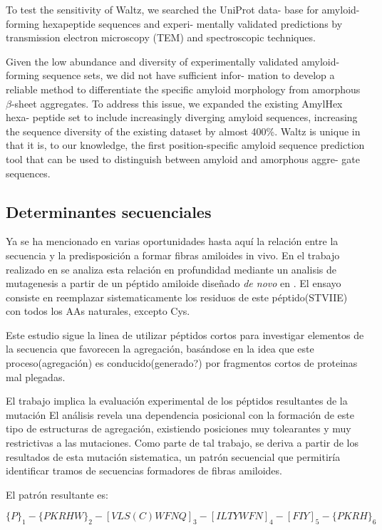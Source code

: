 To test the sensitivity of Waltz, we searched the UniProt data-
base for amyloid-forming hexapeptide sequences and experi-
mentally validated predictions by transmission electron
microscopy (TEM) and spectroscopic techniques.




Given
the low abundance and diversity of experimentally validated
amyloid-forming sequence sets, we did not have sufficient infor-
mation to develop a reliable method to differentiate the specific
amyloid morphology from amorphous $\beta$-sheet aggregates.
To address this issue, we expanded the existing AmylHex hexa-
peptide set to include increasingly diverging amyloid sequences,
increasing the sequence diversity of the existing dataset by almost
400\%. Waltz is unique in that it is, to our knowledge, the first
position-specific amyloid sequence prediction tool that can be
used to distinguish between amyloid and amorphous aggre-
gate sequences.

\subsection{Determinantes secuenciales}
Ya se ha mencionado en varias oportunidades hasta aquí la relación entre la secuencia y la predisposición a formar fibras amiloides in vivo. En el trabajo realizado en \cite{de2004sequence} se analiza esta relación en profundidad mediante un 
analisis de mutagenesis a partir de un péptido amiloide diseñado \textit{de novo} en \cite{de2002novo}. El ensayo consiste en reemplazar sistematicamente los residuos de este péptido(STVIIE) con todos los AAs naturales, excepto Cys.

Este estudio sigue la linea de utilizar péptidos cortos para investigar elementos de la secuencia que favorecen la agregación, 
basándose en la idea que este proceso(agregación) es conducido(generado?) por fragmentos cortos de proteinas mal plegadas.

El trabajo implica la evaluación experimental de los péptidos resultantes de la mutación
El análisis revela una dependencia posicional con la formación de este tipo de estructuras de agregación, existiendo posiciones muy tolearantes y muy restrictivas a las mutaciones.
Como parte de tal trabajo, se deriva a partir de los resultados de esta mutación sistematica, un patrón secuencial que permitiría identificar tramos de secuencias formadores de fibras amiloides.

El patrón resultante es:

$\{P\}_1 -\{PKRHW\}_2 -[VLS(C)WFNQ]_3 -[ILTYWFN]_4 -[FIY]_5- \{PKRH\}_6 $

